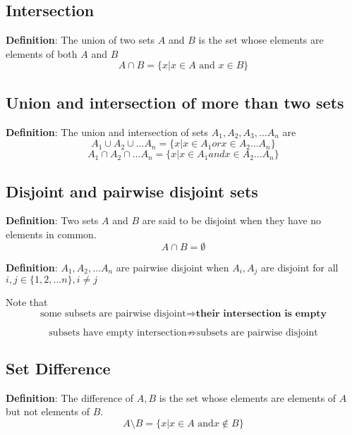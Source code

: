 \subsection{Intersection}
\begin{framed}
   \textbf{Definition}: The union of two sets $A$ and $B$ is the set whose elements are elements of both $A$ and $B$ 
   \[
      A \cap B = \{x | x \in A \text{ and } x \in B \}
   \] 
\end{framed}

\subsection{Union and intersection of more than two sets}
\begin{framed}
 \textbf{Definition}: The union and intersection of sets  $A_1, A_2, A_3, \hdots A_n$ are 
\[
   A_1 \cup A_2 \cup \hdots A_n = \{ x | x \in A_1 or x \in A_2 \hdots  A_n \}
\] 
\[
   A_1 \cap A_2 \cap \hdots A_n = \{ x | x \in A_1 and x \in A_2 \hdots  A_n \}
\]
\end{framed}

\subsection{Disjoint and pairwise disjoint sets}

\begin{framed}
   \textbf{Definition}: Two sets $A$ and $B$ are said to be disjoint when they have no elements in common. 
   \[
     A \cap B = \emptyset
   \] 

   \textbf{Definition}: $A_1, A_2, \hdots A_n$ are pairwise disjoint when $A_i, A_j$ are disjoint for all $i, j \in \{1, 2, \hdots n\}, i \neq j$
\end{framed}

Note that
\[
 \text{some subsets are pairwise disjoint} \Rightarrow \textbf{their intersection is empty}
\] 

\[
  \text{subsets have empty intersection} \nRightarrow \text{subsets are pairwise disjoint}
\] 

\subsection{Set Difference}
\begin{framed}
   \textbf{Definition}: The difference of $A, B$  is the set whose elements are elements of $A$ but not elements of $B$. 
   \[
     A \setminus B = \{ x | x \in A \text{ and} x \notin B \} 
   \] 
\end{framed}


